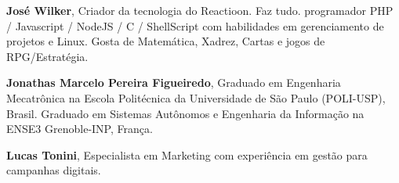 \documentclass[
	article,			%
	12pt,				%
	oneside,			%
	a4paper,			%
	brazil,				%
	english,
	sumario=tradicional
	]{abntex2}
\begin{document}


\begingroup
\makeatletter
\renewcommand{\chapter}{\@gobbletwo}
\makeatother


\endgroup







\textbf{José Wilker}, Criador da tecnologia do Reactioon. Faz tudo. programador PHP / Javascript / NodeJS / C / ShellScript com habilidades em gerenciamento de projetos e Linux. Gosta de  Matemática, Xadrez, Cartas e jogos de RPG/Estratégia.

\textbf{Jonathas Marcelo Pereira Figueiredo}, Graduado em Engenharia Mecatrônica na Escola Politécnica da Universidade de São Paulo (POLI-USP), Brasil. Graduado em Sistemas Autônomos e Engenharia da Informação na ENSE3 Grenoble-INP, França.

\textbf{Lucas Tonini}, Especialista em Marketing com experiência em gestão para campanhas digitais.


\end{document}
